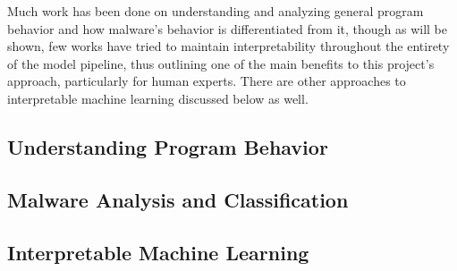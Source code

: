 Much work has been done on understanding and analyzing general program behavior and how malware's behavior is differentiated from it, though as will be shown, few works have tried to maintain interpretability throughout the entirety of the model pipeline, thus outlining one of the main benefits to this project's approach, particularly for human experts. There are other approaches to interpretable machine learning discussed below as well.

\subsection{Understanding Program Behavior}
	

\subsection{Malware Analysis and Classification}
	
	
\subsection{Interpretable Machine Learning}
	